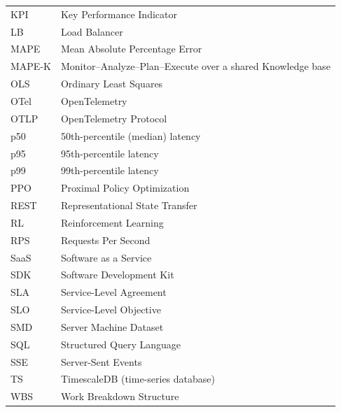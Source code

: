 \begin{singlespace}
\begin{longtable}{@{}l l@{}}
KPI     & Key Performance Indicator \\
LB      & Load Balancer \\
MAPE    & Mean Absolute Percentage Error \\
MAPE-K  & Monitor--Analyze--Plan--Execute over a shared Knowledge base \\
OLS     & Ordinary Least Squares \\
OTel    & OpenTelemetry \\
OTLP    & OpenTelemetry Protocol \\
p50     & 50th-percentile (median) latency \\
p95     & 95th-percentile latency \\
p99     & 99th-percentile latency \\
PPO     & Proximal Policy Optimization \\
REST    & Representational State Transfer \\
RL      & Reinforcement Learning \\
RPS     & Requests Per Second \\
SaaS    & Software as a Service \\
SDK     & Software Development Kit \\
SLA     & Service-Level Agreement \\
SLO     & Service-Level Objective \\
SMD     & Server Machine Dataset \\
SQL     & Structured Query Language \\
SSE     & Server-Sent Events \\
TS      & TimescaleDB (time-series database) \\
WBS     & Work Breakdown Structure \\
\end{longtable}
\end{singlespace}

\clearpage
